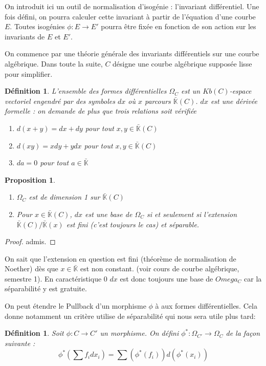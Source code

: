 \documentclass{article}
\newcommand{\K}[0]{\mathbb{K}}
\newcommand{\Kb}[0]{\bar{\K}}
\newtheorem{Prop}[The]{Proposition}
\newtheorem{Def}[The]{Définition}
\begin{document}
On introduit ici un outil de normalisation d'isogénie : l'invariant différentiel. Une fois défini, on pourra calculer cette invariant à partir de l'équation d'une courbe $E$. Toutes isogénies $\phi : E\rightarrow E'$ pourra être fixée en fonction de son action sur les invariants de $E$ et $E'$. 

On commence par une théorie générale des invariants différentiels sur une courbe algébrique. Dans toute la suite, $C$ désigne une courbe algébrique supposée lisse pour simplifier. 

\begin{Def}
	L'ensemble des formes différentielles $\Omega_{C}$ est un $Kb(C)$-espace vectoriel engendré par des symboles $dx$ où $x$ parcours $\Kb(C)$.
	$dx$ est une dérivée formelle : on demande de plus que trois relations soit vérifiée
	\begin{enumerate}
		\item $d(x+y) = dx + dy$ pour tout $x, y \in\Kb(C)$
		\item $d(xy) = xdy + ydx$ pour tout $x, y \in\Kb(C)$
		\item $da = 0$ pour tout $a\in\Kb$
	\end{enumerate}
\end{Def}

\begin{Prop}
	\begin{enumerate}
		\item $\Omega_{C}$ est de dimension 1 sur $\Kb(C)$
		\item Pour $x \in \Kb(C)$, $dx$ est une base de $\Omega_{C}$ si et seulement si l'extension $\Kb(C) / \Kb(x)$ est fini (c'est toujours le cas) et séparable. 
	\end{enumerate}
\end{Prop}

\begin{proof}
	admis.
\end{proof}

On sait que l'extension en question est fini (théorème de normalisation de Noether) dès que $x\in\Kb$ est non constant. (voir cours de courbe algébrique, semestre 1). En caractéristique 0 $dx$ est donc toujours une base de $Omega_{C}$ car la séparabilité y est gratuite. 

On peut étendre le Pullback d'un morphisme $\phi$ à aux formes différentielles. Cela donne notamment un critère utilise de séparabilité qui nous sera utile plus tard:

\begin{Def}
	Soit $\phi : C \rightarrow C'$ un morphisme. On défini $\phi^{*} : \Omega_{C'} \rightarrow \Omega_{C}$ de la façon suivante :
	\begin{equation*}
		\phi^{*}\left(\sum f_idx_i \right) = \sum \left( \phi^{*}(f_i) \right) d\left( \phi^{*}(x_i)\right) 
	\end{equation*}
\end{Def}
\end{document}
